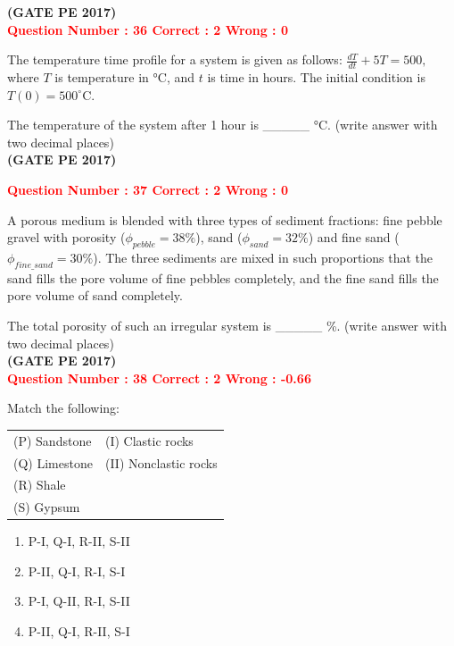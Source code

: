 \documentclass[12pt]{article}
\begin{document}
{\hfill\textbf{(GATE PE 2017)}\\[0.6cm]

\textcolor{red}{\textbf{Question Number : 36 \hfill Correct : 2  Wrong : 0}}

The temperature time profile for a system is given as follows:
{\LARGE$ 
\frac{dT}{dt} + 5T = 500,
$ }
where $T$ is temperature in °C, and $t$ is time in hours. The initial condition is $T(0) = 500^\circ$C.

The temperature of the system after 1 hour is \_\_\_\_\_ °C. (write answer with two decimal places)\\

\hfill\textbf{(GATE PE 2017)}\\[0.6cm]
\newpage

\textcolor{red}{\textbf{Question Number : 37 \hfill Correct : 2  Wrong : 0}}

A porous medium is blended with three types of sediment fractions: fine pebble gravel with porosity ($\phi_{pebble} = 38\%$), sand ($\phi_{sand} = 32\%$) and fine sand ($\phi_{fine\_sand} = 30\%$). The three sediments are mixed in such proportions that the sand fills the pore volume of fine pebbles completely, and the fine sand fills the pore volume of sand completely.

The total porosity of such an irregular system is \_\_\_\_\_ \%. (write answer with two decimal places)\\

\hfill\textbf{(GATE PE 2017)}\\[0.6cm]

\textcolor{red}{\textbf{Question Number : 38 \hfill Correct : 2  Wrong : -0.66}}

Match the following:

\begin{tabular}{ll}
(P) Sandstone & (I) Clastic rocks \\
(Q) Limestone & (II) Nonclastic rocks \\
(R) Shale & \\
(S) Gypsum & \\
\end{tabular}

\begin{enumerate}[label=(\Alph*)]
    \item P-I, Q-I, R-II, S-II \\
    \item P-II, Q-I, R-I, S-I \\
    \item P-I, Q-II, R-I, S-II \\
    \item P-II, Q-I, R-II, S-I
\end{enumerate}

}
\end{document}
